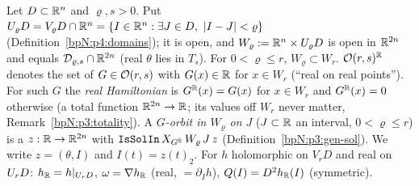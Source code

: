 \begin{definition}\label{bpN:p7:setting}
Let $D\subset\mathbb{R}^n$ and $\varrho,s>0$. Put $U_{\varrho}D=V_\varrho D\cap\mathbb{R}^n=\{I\in\mathbb{R}^n:\exists J\in D,\ \lvert I-J\rvert<\varrho\}$ (Definition~\ref{bpN:p4:domains}); it is open, and $W_\varrho:=\mathbb{R}^n\times U_{\varrho}D$ is open in $\mathbb{R}^{2n}$ and equals $\mathcal D_{\varrho,s}\cap\mathbb{R}^{2n}$ (real $\theta$ lies in $T_s$). For $0<\varrho\le r$, $W_\varrho\subset W_r$.
$\mathcal O(r,s)^{\mathbb{R}}$ denotes the set of $G\in\mathcal O(r,s)$ with $G(x)\in\mathbb{R}$ for $x\in W_r$ (``real on real points''). For such $G$ the \emph{real Hamiltonian} is $G^{\mathbb{R}}(x)=G(x)$ for $x\in W_r$ and $G^{\mathbb{R}}(x)=0$ otherwise (a total function $\mathbb{R}^{2n}\to\mathbb{R}$; its values off $W_r$ never matter, Remark~\ref{bpN:p3:totality}).
A \emph{$G$-orbit in $W_\varrho$ on $J$} ($J\subset\mathbb{R}$ an interval, $0<\varrho\le r$) is a $z:\mathbb{R}\to\mathbb{R}^{2n}$ with $\texttt{IsSolIn}\,X_{G^{\mathbb{R}}}\,W_\varrho\,J\,z$ (Definition~\ref{bpN:p3:gen-sol}). We write $z=(\theta,I)$ and $I(t)=z(t)_2$.
For $h$ holomorphic on $V_rD$ and real on $U_{r}D$: $h_{\mathbb{R}}=h|_{U_{r}D}$, $\omega=\nabla h_{\mathbb{R}}$ (real, $=\partial_Ih$), $Q(I)=D^2h_{\mathbb{R}}(I)$ (symmetric).
\end{definition}

